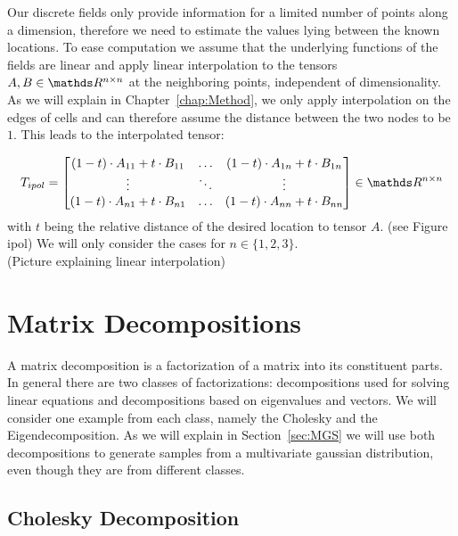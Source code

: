 Our discrete fields only provide information for a limited number of
points along a dimension, therefore we need to estimate the values lying
between the known locations. To ease computation we assume that the
underlying functions of the fields are linear and apply linear
interpolation to the tensors $A, B \in \real^{n \times n}$ at the
neighboring points, independent of dimensionality. As we will explain in
Chapter~\ref{chap:Method}, we only apply interpolation on the edges of
cells and can therefore assume the distance between the two nodes to be
$1$. This leads to the interpolated tensor:

\begin{equation}
  T_{ipol} =
  \begin{bmatrix}
    (1-t) \cdot A_{11} + t \cdot B_{11} & \dots & (1-t) \cdot A_{1n} + t \cdot B_{1n} \\
    \vdots & \ddots & \vdots \\
    (1-t) \cdot A_{n1} + t \cdot B_{n1} & \dots & (1-t) \cdot A_{nn} + t \cdot B_{nn} \\
  \end{bmatrix}
  \in \real^{n \times n}
\end{equation}
with $t$ being the relative distance of the desired location to tensor
$A$. (see Figure ipol) We will only consider the cases for $n \in
\{1,2,3\}$. \\
(Picture explaining linear interpolation)

\section{Matrix Decompositions}

A matrix decomposition is a factorization of a matrix into its
constituent parts. In general there are two classes of factorizations:
decompositions used for solving linear equations and decompositions
based on eigenvalues and vectors. We will consider one example from each
class, namely the Cholesky and the Eigendecomposition. As we will
explain in Section~\ref{sec:MGS} we will use both decompositions to
generate samples from a multivariate gaussian distribution, even though
they are from different classes.

\subsection{Cholesky Decomposition}

